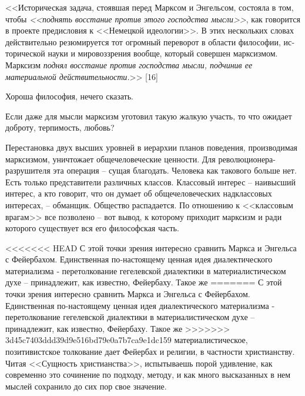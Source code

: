 \documentclass{book}
\begin{document}
<<Историческая задача, стоявшая перед Марксом и Энгельсом, состояла в том, чтобы \textit{<<поднять восстание против этого 
господства мысли>>},  как говорится в проекте предисловия к <<Немецкой идеологии>>. В этих нескольких словах действительно 
резюмируется тот огромный переворот в области философии, ис­торической науки и мировоззрения вообще, который совершен марксизмом. 
Марксизм \textit{поднял восстание против господства мысли, подчинив ее материальной действительности.}>> [16]

Хороша философия, нечего сказать.

Если даже для мысли марксизм уготовил такую жалкую участь, то что ожидает доброту, терпимость, любовь?

Перестановка двух высших уровней в иерархии планов поведения, производимая марксизмом, уничтожает общечеловеческие ценности. Для 
революционера-разрушителя эта операция -- сущая благодать. Человека как такового больше нет. Есть только представители различных 
классов. Классовый интерес -- наивысший интерес, а кто говорит, что он думает об общечеловеческих надклассовых  интересах, -- 
обманщик. Общество распадается. По отношению к <<классовым врагам>> все позволено -- вот вывод, к которому приходит марксизм и 
ради которого существует вся его философская часть.

<<<<<<< HEAD
С этой точки зрения интересно сравнить Маркса и Энгельса с Фейербахом. Единственная по‑настоящему ценная идея диалек­тического 
материализма ‑ перетолкование гегелевской диа­лектики в материалистическом духе -- принадлежит, как извест­но, Фейербаху. Такое же 
=======
С этой точки зрения интересно сравнить Маркса и Энгельса с Фейербахом. Единственная по-настоящему ценная идея диалек­тического 
материализма - перетолкование гегелевской диа­лектики в материалистическом духе -- принадлежит, как извест­но, Фейербаху. Такое же 
>>>>>>> 3d45c7403ddd39d9e516bd79e0a7b7ca9e1dc159
материалистическое, позитивистское толкование дает Фейербах и религии, в частности христианству. Читая <<Сущность христианства>>, 
испытываешь порой удивле­ние, как современно это сочинение по подходу, методу, и как много высказанных в нем мыслей сохранило до 
сих пор свое значение.
\end{document}
